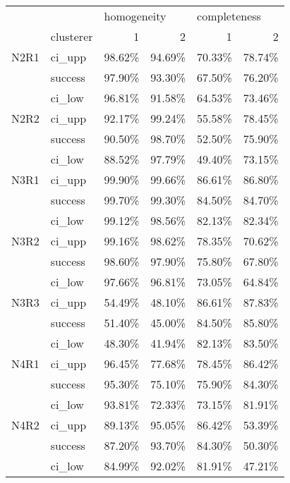 \begin{tabular}{llrrrr}
\toprule
     & {} & \multicolumn{2}{l}{homogeneity} & \multicolumn{2}{l}{completeness} \\
     & clusterer &           1 &      2 &            1 &      2 \\
\midrule
N2R1 & ci\_upp &      98.62\% & 94.69\% &       70.33\% & 78.74\% \\
     & success &      97.90\% & 93.30\% &       67.50\% & 76.20\% \\
     & ci\_low &      96.81\% & 91.58\% &       64.53\% & 73.46\% \\
N2R2 & ci\_upp &      92.17\% & 99.24\% &       55.58\% & 78.45\% \\
     & success &      90.50\% & 98.70\% &       52.50\% & 75.90\% \\
     & ci\_low &      88.52\% & 97.79\% &       49.40\% & 73.15\% \\
N3R1 & ci\_upp &      99.90\% & 99.66\% &       86.61\% & 86.80\% \\
     & success &      99.70\% & 99.30\% &       84.50\% & 84.70\% \\
     & ci\_low &      99.12\% & 98.56\% &       82.13\% & 82.34\% \\
N3R2 & ci\_upp &      99.16\% & 98.62\% &       78.35\% & 70.62\% \\
     & success &      98.60\% & 97.90\% &       75.80\% & 67.80\% \\
     & ci\_low &      97.66\% & 96.81\% &       73.05\% & 64.84\% \\
N3R3 & ci\_upp &      54.49\% & 48.10\% &       86.61\% & 87.83\% \\
     & success &      51.40\% & 45.00\% &       84.50\% & 85.80\% \\
     & ci\_low &      48.30\% & 41.94\% &       82.13\% & 83.50\% \\
N4R1 & ci\_upp &      96.45\% & 77.68\% &       78.45\% & 86.42\% \\
     & success &      95.30\% & 75.10\% &       75.90\% & 84.30\% \\
     & ci\_low &      93.81\% & 72.33\% &       73.15\% & 81.91\% \\
N4R2 & ci\_upp &      89.13\% & 95.05\% &       86.42\% & 53.39\% \\
     & success &      87.20\% & 93.70\% &       84.30\% & 50.30\% \\
     & ci\_low &      84.99\% & 92.02\% &       81.91\% & 47.21\% \\

\end{tabular}
